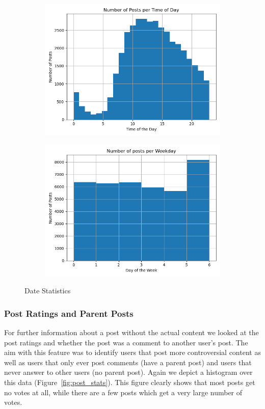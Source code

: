 \documentclass[acmsmall]{acmart}
\begin{document}
\begin{figure}
\centering
\begin{subfigure}{.5\textwidth}
\centering
  \includegraphics[width=.9\linewidth]{assets/Number_of_posts_per_time_of_day.png}
 \end{subfigure}%
\begin{subfigure}{.5\textwidth}
\centering
  \includegraphics[width=.9\linewidth]{assets/Number_of_posts_per_day_of_week.png}
 \end{subfigure}
 \caption{Date Statistics}
\label{fig:date_stats}
\end{figure}

\subsubsection{Post Ratings and Parent Posts}
For further information about a post without the actual content we looked at the post ratings and whether the post was a comment to another user's post. The aim with this feature was to identify users that post more controversial content as well as users that only ever post comments (have a parent post) and users that never answer to other users (no parent post). Again we depict a histogram over this data (Figure~\ref{fig:post_stats}). This figure clearly shows that most posts get no votes at all, while there are a few posts which get a very large number of votes. 
\end{document}

